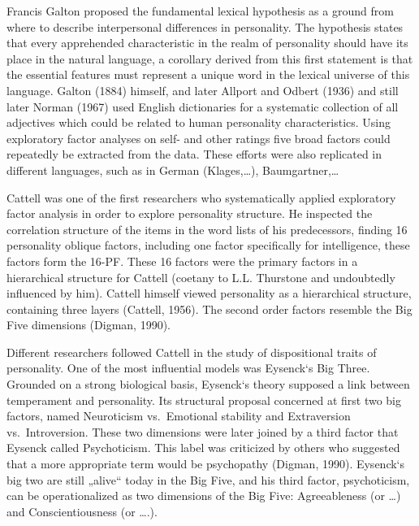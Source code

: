 \documentclass[,man,floatsintext]{apa6}
\theoremstyle{definition}
\theoremstyle{definition}
\theoremstyle{definition}
\theoremstyle{remark}
\begin{document}
Francis Galton proposed the fundamental lexical hypothesis as a ground
from where to describe interpersonal differences in personality. The
hypothesis states that every apprehended characteristic in the realm of
personality should have its place in the natural language, a corollary
derived from this first statement is that the essential features must
represent a unique word in the lexical universe of this language. Galton
(1884) himself, and later Allport and Odbert (1936) and still later
Norman (1967) used English dictionaries for a systematic collection of
all adjectives which could be related to human personality
characteristics. Using exploratory factor analyses on self- and other
ratings five broad factors could repeatedly be extracted from the data.
These efforts were also replicated in different languages, such as in
German (Klages,\ldots{}), Baumgartner,\ldots{}

Cattell was one of the first researchers who systematically applied
exploratory factor analysis in order to explore personality structure.
He inspected the correlation structure of the items in the word lists of
his predecessors, finding 16 personality oblique factors, including one
factor specifically for intelligence, these factors form the 16-PF.
These 16 factors were the primary factors in a hierarchical structure
for Cattell (coetany to L.L. Thurstone and undoubtedly influenced by
him). Cattell himself viewed personality as a hierarchical structure,
containing three layers (Cattell, 1956). The second order factors
resemble the Big Five dimensions (Digman, 1990).

Different researchers followed Cattell in the study of dispositional
traits of personality. One of the most influential models was Eysenck`s
Big Three. Grounded on a strong biological basis, Eysenck`s theory
supposed a link between temperament and personality. Its structural
proposal concerned at first two big factors, named Neuroticism
vs.~Emotional stability and Extraversion vs.~Introversion. These two
dimensions were later joined by a third factor that Eysenck called
Psychoticism. This label was criticized by others who suggested that a
more appropriate term would be psychopathy (Digman, 1990). Eysenck`s big
two are still „alive`` today in the Big Five, and his third factor,
psychoticism, can be operationalized as two dimensions of the Big Five:
Agreeableness (or \ldots{}) and Conscientiousness (or \ldots{}.).
\end{document}
